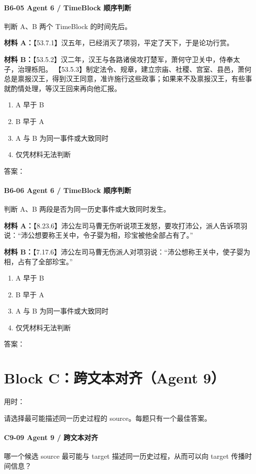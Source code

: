 \documentclass[fontset=none,11pt,a4paper]{ctexart}
\newcommand{\answerline}[1]{\underline{\hspace{#1}}}
\newcommand{\blocktime}{\vspace{0.25em}\noindent 用时：\answerline{4cm}\par\vspace{0.6em}}
\begin{document}
\paragraph{B6-05 \quad Agent 6 / TimeBlock 顺序判断}
判断 A、B 两个 TimeBlock 的时间先后。


\textbf{材料 A：}【53.7.1】汉五年，已经消灭了项羽，平定了天下，于是论功行赏。

\textbf{材料 B：}【53.5.2】汉二年，汉王与各路诸侯攻打楚军，萧何守卫关中，侍奉太子，治理栎阳。 【53.5.3】制定法令、规章，建立宗庙、社稷、宫室、县邑，萧何总是禀报汉王，得到汉王同意，准许施行这些政事；如果来不及禀报汉王，有些事就酌情处理，等汉王回来再向他汇报。


\begin{enumerate}[label=\Alph*.]
  \item A 早于 B
  \item B 早于 A
  \item A 与 B 为同一事件或大致同时
  \item 仅凭材料无法判断
\end{enumerate}
答案：\answerline{2.2cm}

\paragraph{B6-06 \quad Agent 6 / TimeBlock 顺序判断}
判断 A、B 两段是否为同一历史事件或大致同时发生。


\textbf{材料 A：}【8.23.6】沛公左司马曹无伤听说项王发怒，要攻打沛公，派人告诉项羽说：“沛公想要称王关中，令子婴为相，珍宝被他全部占有了。”

\textbf{材料 B：}【7.17.6】沛公左司马曹无伤派人对项羽说：“沛公想称王关中，使子婴为相，占有了全部珍宝。”


\begin{enumerate}[label=\Alph*.]
  \item A 早于 B
  \item B 早于 A
  \item A 与 B 为同一事件或大致同时
  \item 仅凭材料无法判断
\end{enumerate}
答案：\answerline{2.2cm}


\newpage
\section{Block C：跨文本对齐（Agent 9）}
\blocktime
请选择最可能描述同一历史过程的 source。每题只有一个最佳答案。

\paragraph{C9-09 \quad Agent 9 / 跨文本对齐}
哪一个候选 source 最可能与 target 描述同一历史过程，从而可以向 target 传播时间信息？
\end{document}
